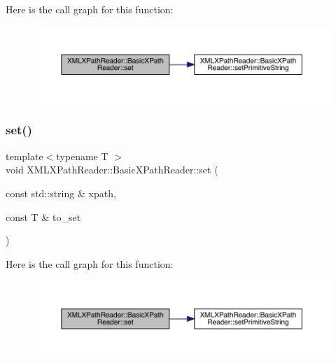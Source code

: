 Here is the call graph for this function\+:
\nopagebreak
\begin{figure}[H]
\begin{center}
\leavevmode
\includegraphics[width=350pt]{d6/dbf/classXMLXPathReader_1_1BasicXPathReader_a4cf7407f107bf4f307b70af4cccbd30e_cgraph}
\end{center}
\end{figure}
\mbox{\label{classXMLXPathReader_1_1BasicXPathReader_a4cf7407f107bf4f307b70af4cccbd30e}} 
\subsubsection{\texorpdfstring{set()}{set()}\hspace{0.1cm}{\footnotesize\ttfamily [2/3]}}
{\footnotesize\ttfamily template$<$typename T $>$ \\
void X\+M\+L\+X\+Path\+Reader\+::\+Basic\+X\+Path\+Reader\+::set (\begin{DoxyParamCaption}\item[{const std\+::string \&}]{xpath,  }\item[{const T \&}]{to\+\_\+set }\end{DoxyParamCaption})\hspace{0.3cm}{\ttfamily [inline]}}

Here is the call graph for this function\+:
\nopagebreak
\begin{figure}[H]
\begin{center}
\leavevmode
\includegraphics[width=350pt]{d6/dbf/classXMLXPathReader_1_1BasicXPathReader_a4cf7407f107bf4f307b70af4cccbd30e_cgraph}
\end{center}
\end{figure}
\mbox{\label{classXMLXPathReader_1_1BasicXPathReader_a4cf7407f107bf4f307b70af4cccbd30e}} 
